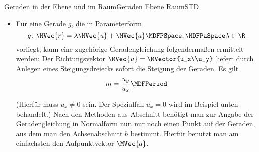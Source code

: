 \begin{MXContent}{Geraden in der Ebene und im Raum}{Geraden Ebene Raum}{STD}
\begin{MInfo}
\begin{itemize}
\[
 g\colon \MVec{r}=x\MVector{1\\m}+\MVector{0\\b}\MDFPSpace,\MDFPaSpace x\in\R
\]
mit dem Richtungsvektor $\MVec{u}=\MVector{1\\m}$ und dem Aufpunktvektor $\MVec{a}=\MVector{0\\b}$.
\item Für eine Gerade $g$, die in Parameterform
\[
 g\colon \MVec{r}=\lambda\MVec{u}+\MVec{a}\MDFPSpace,\MDFPaSpace\lambda\in\R
\]
vorliegt, kann eine zugehörige Geradengleichung folgendermaßen ermittelt werden: Der Richtungsvektor $\MVec{u}=\MVector{u_x\\u_y}$ liefert durch Anlegen eines Steigungsdreiecks sofort die Steigung der Geraden. Es gilt
\[
 m=\frac{u_y}{u_x} \MDFPeriod
\]
\begin{center}
\end{center}
(Hierfür muss $u_x\neq0$ sein. Der Spezialfall $u_x=0$ wird im Beispiel unten behandelt.) Nach den Methoden aus Abschnitt  benötigt man zur Angabe der Geradengleichung in Normalform nun nur noch einen Punkt auf der Geraden, aus dem man den Achsenabschnitt $b$ bestimmt. Hierfür benutzt man am einfachsten den Aufpunktvektor $\MVec{a}$.
\end{itemize}



\end{MInfo}
\end{MXContent}
